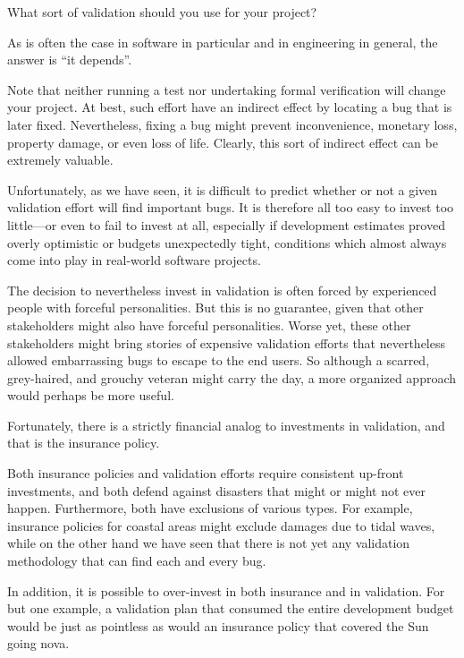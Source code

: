 What sort of validation should you use for your project?

As is often the case in software in particular and in engineering
in general, the answer is ``it depends''.

Note that neither running a test nor undertaking formal verification
will change your project.
At best, such effort have an indirect effect by locating a bug that
is later fixed.
Nevertheless, fixing a bug might prevent inconvenience, monetary loss,
property damage, or even loss of life.
Clearly, this sort of indirect effect can be extremely valuable.

Unfortunately, as we have seen, it is difficult to predict whether or
not a given validation effort will find important bugs.
It is therefore all too easy to invest too little---or even to fail
to invest at all, especially if development estimates proved overly
optimistic or budgets unexpectedly tight, conditions which almost
always come into play in real-world software projects.

The decision to nevertheless invest in validation is often forced by
experienced people with forceful personalities.
But this is no guarantee, given that other stakeholders might also
have forceful personalities.
Worse yet, these other stakeholders might bring stories of expensive
validation efforts that nevertheless allowed embarrassing bugs to
escape to the end users.
So although a scarred, grey-haired, and grouchy veteran might carry
the day, a more organized approach would perhaps be more useful.

Fortunately, there is a strictly financial analog to investments in
validation, and that is the insurance policy.


Both insurance policies and validation efforts require consistent
up-front investments, and both defend against disasters that might
or might not ever happen.
Furthermore, both have exclusions of various types.
For example, insurance policies for coastal areas might exclude
damages due to tidal waves, while on the other hand we have seen
that there is not yet any validation methodology that can find
each and every bug.

In addition, it is possible to over-invest in both insurance and
in validation.
For but one example, a validation plan that consumed the entire
development budget would be just as pointless as would an insurance
policy that covered the Sun going nova.

